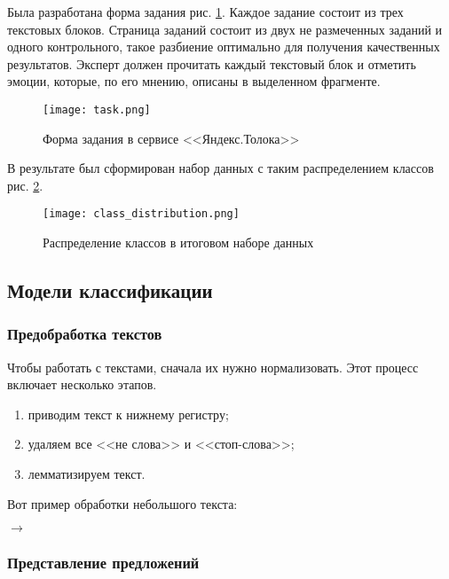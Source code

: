 \bigskip
Была разработана форма задания рис. \ref{fig:task}. Каждое задание состоит из трех текстовых блоков. Страница заданий состоит из двух не размеченных заданий и одного контрольного, такое разбиение оптимально для получения качественных результатов. Эксперт должен прочитать каждый текстовый блок и отметить эмоции, которые, по его мнению, описаны в выделенном фрагменте.

\begin{figure}[ht]
    \centering
    \texttt{[image: task.png]}
    \caption{Форма задания в сервисе <<Яндекс.Толока>>}
    \label{fig:task}
\end{figure}

\bigskip
В результате был сформирован набор данных с таким распределением классов рис. \ref{fig:class_distribution}.



\begin{figure}[ht]
    \centering
    \texttt{[image: class\_distribution.png]}
    \caption{Распределение классов в итоговом наборе данных}
    \label{fig:class_distribution}
\end{figure}

\subsection{Модели классификации}
\vspace{-1.3cm}
\subsubsection{Предобработка текстов}

Чтобы работать с текстами, сначала их нужно нормализовать. Этот процесс включает несколько этапов.

\bigskip
\begin{enumerate}
 \item приводим текст к нижнему регистру;
 \item удаляем все <<не слова>> и <<стоп-слова>>;
 \item лемматизируем текст.
\end{enumerate}

\bigskip
Вот пример обработки небольшого текста:

\bigskip
{} $\to$ 


\subsubsection{Представление предложений}


